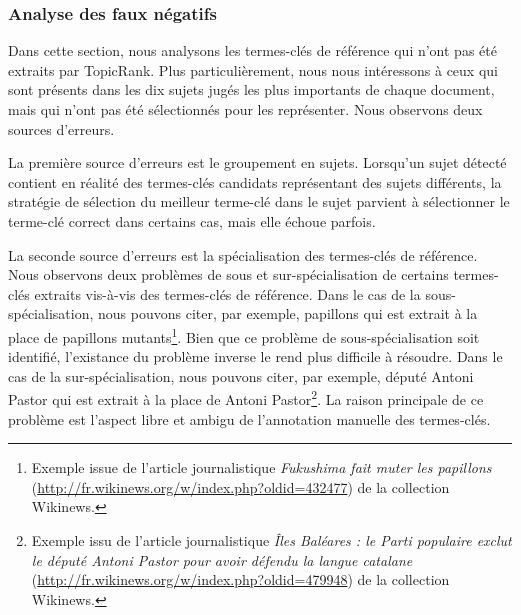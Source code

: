         \subsubsection{Analyse des faux négatifs}
        \label{subsubsec:main-automatic_keyphrase_annotation-unsupervised_automatic_keyphrase_extraction-error_analysis-false_negatives}
          Dans cette section, nous analysons les termes-clés de référence qui
          n'ont pas été extraits par TopicRank. Plus particulièrement, nous nous
          intéressons à ceux qui sont présents dans les dix sujets jugés les
          plus importants de chaque document, mais qui n'ont pas été
          sélectionnés pour les représenter. Nous observons deux sources
          d'erreurs.

          La première source d'erreurs est le groupement en sujets. Lorsqu'un
          sujet détecté contient en réalité des termes-clés candidats
          représentant des sujets différents, la stratégie de sélection du
          meilleur terme-clé dans le sujet parvient à sélectionner le terme-clé
          correct dans certains cas, mais elle échoue parfois.


          La seconde source d'erreurs est la spécialisation des termes-clés de
          référence. Nous observons deux problèmes de sous et sur-spécialisation
          de certains termes-clés extraits vis-à-vis des termes-clés de
          référence. Dans le cas de la sous-spécialisation, nous pouvons citer,
          par exemple, \og{}papillons\fg{} qui est extrait à la place de
          \og{}papillons mutants\fg{}\footnote{Exemple issue de l'article
          journalistique \textit{Fukushima fait muter les papillons}
          (\url{http://fr.wikinews.org/w/index.php?oldid=432477}) de la
          collection Wikinews.}. Bien que ce problème de sous-spécialisation
          soit identifié, l'existance du problème inverse le rend plus difficile
          à résoudre. Dans le cas de la sur-spécialisation, nous pouvons citer,
          par exemple, \og{}député Antoni Pastor\fg{} qui est extrait à la place
          de \og{}Antoni Pastor\fg{}\footnote{Exemple issu de l'article
          journalistique \textit{Îles Baléares : le Parti populaire exclut le
          député Antoni Pastor pour avoir défendu la langue catalane}
          (\url{http://fr.wikinews.org/w/index.php?oldid=479948}) de la
          collection Wikinews.}. La raison principale de ce problème est
          l'aspect libre et ambigu de l'annotation manuelle des termes-clés.

